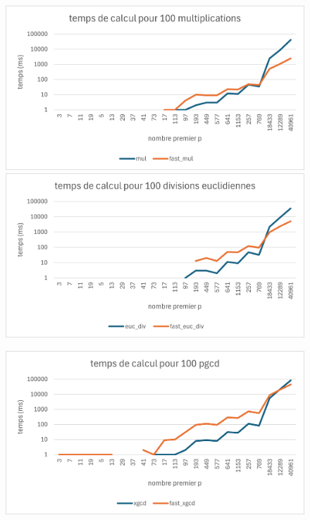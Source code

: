 \documentclass{article}
\theoremstyle{definition}
\theoremstyle{remark}
\begin{document}
\begin{figure}[h]
    \centering
    \begin{minipage}{.5\textwidth}
        \includegraphics[width=\textwidth]{RS_mul.png}
    \end{minipage}%
    \begin{minipage}{.5\textwidth}
        \includegraphics[width=\textwidth]{RS_div.png}
    \end{minipage}
\end{figure}

\begin{figure}
    \centering
    \begin{minipage}{.5\textwidth}
        \includegraphics[width=\textwidth]{RS_gcd.png}
    \end{minipage}
\end{figure}
\end{document}
